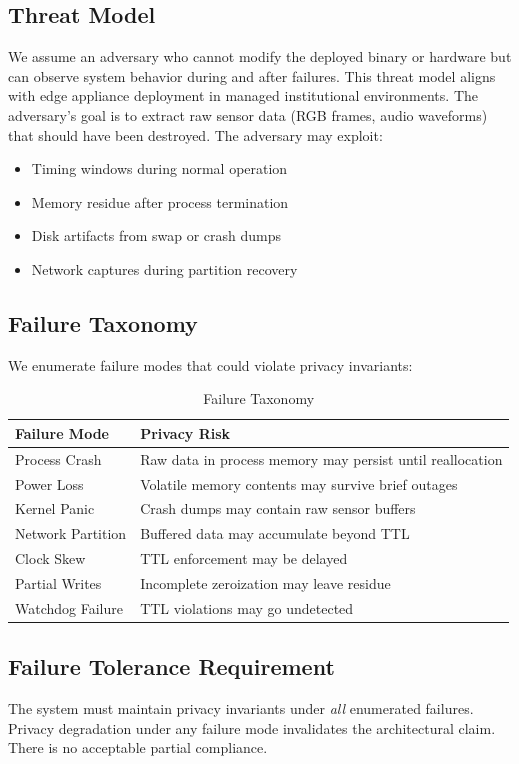 \documentclass[conference]{IEEEtran}
\begin{document}
\subsection{Threat Model}
We assume an adversary who cannot modify the deployed binary or hardware but can observe system behavior during and after failures. This threat model aligns with edge appliance deployment in managed institutional environments. The adversary's goal is to extract raw sensor data (RGB frames, audio waveforms) that should have been destroyed. The adversary may exploit:
\begin{itemize}
    \item Timing windows during normal operation
    \item Memory residue after process termination
    \item Disk artifacts from swap or crash dumps
    \item Network captures during partition recovery
\end{itemize}

\subsection{Failure Taxonomy}
We enumerate failure modes that could violate privacy invariants:

\begin{table}[h]
\caption{Failure Taxonomy}
\centering
\begin{tabular}{p{2.5cm} p{5cm}}
\toprule
\textbf{Failure Mode} & \textbf{Privacy Risk} \\
\midrule
Process Crash & Raw data in process memory may persist until reallocation \\
Power Loss & Volatile memory contents may survive brief outages \\
Kernel Panic & Crash dumps may contain raw sensor buffers \\
Network Partition & Buffered data may accumulate beyond TTL \\
Clock Skew & TTL enforcement may be delayed \\
Partial Writes & Incomplete zeroization may leave residue \\
Watchdog Failure & TTL violations may go undetected \\
\bottomrule
\end{tabular}
\label{tab:failure}
\end{table}

\subsection{Failure Tolerance Requirement}
The system must maintain privacy invariants under \textit{all} enumerated failures. Privacy degradation under any failure mode invalidates the architectural claim. There is no acceptable partial compliance.
\end{document}
